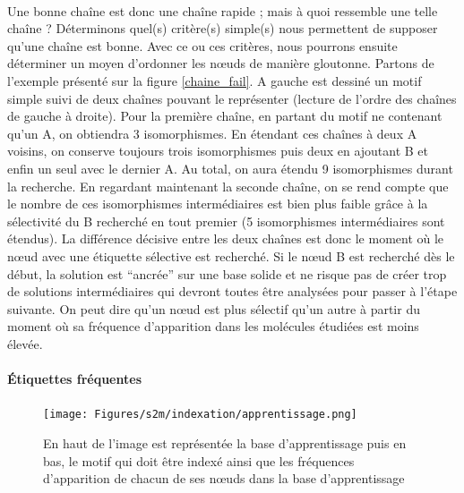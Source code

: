 \documentclass[12pt,french,twoside]{report}
\begin{document}
\paragraph{}Une bonne chaîne est donc une chaîne rapide ; mais à quoi ressemble une telle chaîne ? Déterminons quel(s) critère(s)
simple(s) nous permettent de supposer qu'une chaîne est bonne. Avec ce ou ces critères, nous pourrons ensuite déterminer un
moyen d'ordonner les n\oe{}uds de manière gloutonne. Partons de l'exemple présenté sur la figure \ref{chaine_fail}. A gauche est
dessiné un motif simple suivi de deux chaînes pouvant le représenter (lecture de l'ordre des chaînes de gauche à droite). Pour
la première chaîne, en partant du motif ne contenant qu'un A, on obtiendra 3 isomorphismes. En étendant ces chaînes à deux A
voisins, on conserve toujours trois isomorphismes puis deux en ajoutant B et enfin un seul avec le dernier A. Au total, on aura
étendu 9 isomorphismes durant la recherche. En regardant maintenant la seconde chaîne, on se rend compte que le nombre de ces
isomorphismes intermédiaires est bien plus faible grâce à la sélectivité du B recherché en tout premier (5 isomorphismes
intermédiaires sont étendus). La différence décisive entre les deux chaînes est donc le moment où le n\oe{}ud avec une étiquette sélective
est recherché. Si le n\oe{}ud B est recherché dès le début, la solution est ``ancrée'' sur une base solide et ne risque pas de 
créer trop de solutions intermédiaires qui devront toutes être analysées pour passer à l'étape suivante. On peut dire qu'un n\oe{}ud
est plus sélectif qu'un autre à partir du moment où sa fréquence d'apparition dans les molécules étudiées est moins élevée.

\paragraph{Étiquettes fréquentes}

\begin{figure}
  \texttt{[image: Figures/s2m/indexation/apprentissage.png]}
  \caption{\label{apprentissage}En haut de l'image est représentée la base d'apprentissage puis en bas, le motif qui doit être
  indexé ainsi que les fréquences d'apparition de chacun de ses n\oe{}uds dans la base d'apprentissage}
\end{figure}
\end{document}
